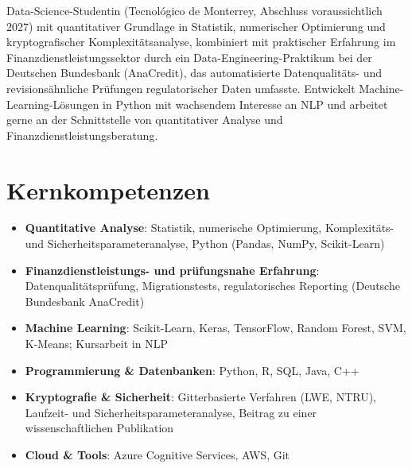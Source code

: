\documentclass[11pt,a4paper,sans]{moderncv}
\begin{document}
\makecvtitle


\vspace{6pt}
\small{Data-Science-Studentin (Tecnológico de Monterrey, Abschluss voraussichtlich 2027) mit quantitativer Grundlage in Statistik, numerischer Optimierung und kryptografischer Komplexitätsanalyse, kombiniert mit praktischer Erfahrung im Finanzdienstleistungssektor durch ein Data-Engineering-Praktikum bei der Deutschen Bundesbank (AnaCredit), das automatisierte Datenqualitäts- und revisionsähnliche Prüfungen regulatorischer Daten umfasste. Entwickelt Machine-Learning-Lösungen in Python mit wachsendem Interesse an NLP und arbeitet gerne an der Schnittstelle von quantitativer Analyse und Finanzdienstleistungsberatung.}


\section{Kernkompetenzen}
\vspace{1pt}
\begin{itemize}

\item \textbf{Quantitative Analyse}: Statistik, numerische Optimierung, Komplexitäts- und Sicherheitsparameteranalyse, Python (Pandas, NumPy, Scikit-Learn)

\item \textbf{Finanzdienstleistungs- und prüfungsnahe Erfahrung}: Datenqualitätsprüfung, Migrationstests, regulatorisches Reporting (Deutsche Bundesbank AnaCredit)

\item \textbf{Machine Learning}: Scikit-Learn, Keras, TensorFlow, Random Forest, SVM, K-Means; Kursarbeit in NLP

\item \textbf{Programmierung \& Datenbanken}: Python, R, SQL, Java, C++

\item \textbf{Kryptografie \& Sicherheit}: Gitterbasierte Verfahren (LWE, NTRU), Laufzeit- und Sicherheitsparameteranalyse, Beitrag zu einer wissenschaftlichen Publikation

\item \textbf{Cloud \& Tools}: Azure Cognitive Services, AWS, Git

\end{itemize}
\end{document}
